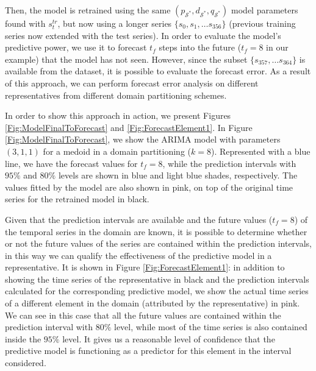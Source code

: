 Then, the model is retrained using the same $(p_{\mathcal{S}^{*}}, d_{\mathcal{S}^{*}}, q_{\mathcal{S}^{*}})$ model parameters found with $s^{tr}_t$, but now using a longer series $\lbrace s_0, s_1, \ldots s_{356} \rbrace$ (previous training series now extended with the test series). In order to evaluate the model's predictive power, we use it to forecast $t_f$ steps into the future ($t_f = 8$ in our example) that the model has not seen. However, since the subset $\lbrace s_{357}, \ldots s_{364} \rbrace$ is available from the dataset, it is possible to evaluate the forecast error. As a result of this approach, we can perform forecast error analysis on different representatives from different domain partitioning schemes.

In order to show this approach in action, we present Figures \ref{Fig:ModelFinalToForecast} and \ref{Fig:ForecastElement1}. In Figure \ref{Fig:ModelFinalToForecast}, we show the ARIMA model with parameters $(3,1,1)$ for a medoid in a domain partitioning ($k=8$). Represented with a blue line, we have the forecast values for $t_{f} = 8$, while the prediction intervals with $95\%$ and $80\%$ levels are shown in blue and light blue shades, respectively. The values fitted by the model are also shown in pink, on top of the original time series for the retrained model in black.

Given that the prediction intervals are available and the future values ($t_f = 8$) of the temporal series in the domain are known, it is possible to determine whether or not the future values of the series are contained within the prediction intervals, in this way we can qualify the effectiveness of the predictive model in a representative. It is shown in Figure \ref{Fig:ForecastElement1}: in addition to showing the time series of the representative in black and the prediction intervals calculated for the corresponding predictive model, we show the actual time series of a different element in the domain (attributed by the representative) in pink. We can see in this case that all the future values are contained within the prediction interval with $80\%$ level, while most of the time series is also contained inside the $95\%$ level. It gives us a reasonable level of confidence that the predictive model is functioning as a predictor for this element in the interval considered.

